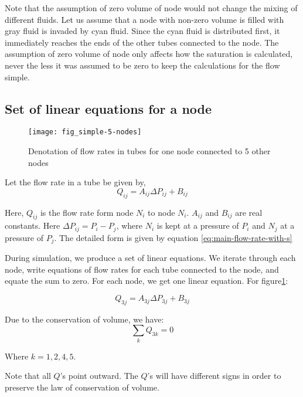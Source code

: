 	Note that the assumption of zero volume of node would not change the mixing of different fluids. Let us assume that a node with non-zero volume is filled with gray fluid is invaded by cyan fluid. Since the cyan fluid is distributed first, it immediately reaches the ends of the other tubes connected to the node. The assumption of zero volume of node only affects how the saturation is calculated, never the less it was assumed to be zero to keep the calculations for the flow simple.

\subsection{Set of linear equations for a node} \label{sec:linear-equ}
	\begin{figure}[H]
		\centering
		\texttt{[image: fig\_simple-5-nodes]}
		\caption{Denotation of flow rates in tubes for one node connected to 5 other nodes}
		\label{fig:simple-5-nodes}
	\end{figure}
	
	Let the flow rate in a tube be given by,
	\begin{equation}  \label{eq:flow-rate-simple-coeff}
		Q_{ij} = A_{ij}\Delta P_{ij} + B_{ij}
	\end{equation}
	
	Here, $Q_{ij}$ is the flow rate form node $N_i$ to node $N_i$. $A_{ij}$ and $B_{ij}$ are real constants. Here $\Delta P_{ij} = P_i - P_j$, where $N_i$ is kept at a pressure of $P_i$ and $N_j$ at a pressure of $P_j$. The detailed form is given by equation \ref{eq:main-flow-rate-with-s}
	
	During simulation, we produce a set of linear equations. We iterate through each node, write equations of flow rates for each tube connected to the node, and equate the sum to zero. For each node, we get one linear equation. For figure\ref{fig:simple-5-nodes}:
	
	\begin{equation}
		Q_{3j} = A_{3j}\Delta P_{3j} + B_{3j}
	\end{equation}

	Due to the conservation of volume, we have:
	\begin{equation}
		\sum_{k} Q_{3k} = 0
	\end{equation}
	
	Where $k = {1, 2, 4, 5}$.
	
	Note that all $Q$'s point outward. The $Q$'s will have different signs in order to preserve the law of conservation of volume. 
	
